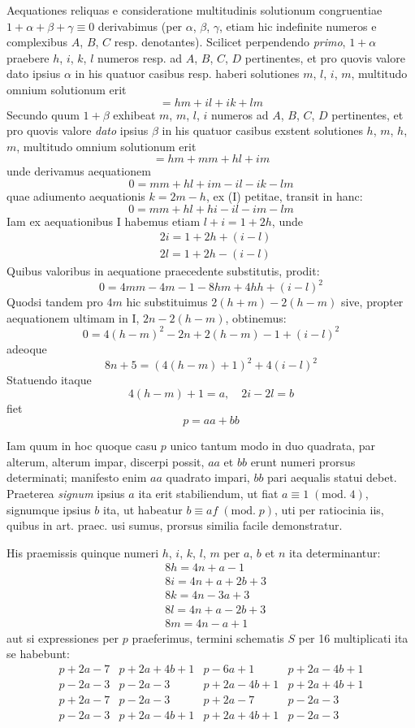 \documentclass[twoside,12pt]{memoir}
\renewcommand{\pmod}[1]{\;(\textrm{mod.}\;#1)}
\begin{document}
Aequationes reliquas e consideratione multitudinis solutionum congruentiae \(1+\alpha+\beta+\gamma \equiv 0\) derivabimus (per \(\alpha\), \(\beta\), \(\gamma\), etiam hic indefinite numeros e complexibus \(A\), \(B\), \(C\) resp. denotantes). Scilicet perpendendo \textit{primo}, \(1+\alpha\) praebere \(h\), \(i\), \(k\), \(l\) numeros resp. ad \(A\), \(B\), \(C\), \(D\) pertinentes, et pro quovis valore dato ipsius \(\alpha\) in his quatuor casibus resp. haberi solutiones \(m\), \(l\), \(i\), \(m\), multitudo omnium solutionum erit
\[=h m+i l+i k+l m\]
Secundo quum \(1+\beta\) exhibeat \(m\), \(m\), \(l\), \(i\) numeros ad \(A\), \(B\), \(C\), \(D\) pertinentes, et pro quovis valore \textit{dato} ipsius \(\beta\) in his quatuor casibus exstent solutiones \(h\), \(m\), \(h\), \(m\), multitudo omnium solutionum erit
\[=h m+m m+h l+i m\]
unde derivamus aequationem
\[0=m m+h l+i m-i l-i k-l m\]
quae adiumento aequationis \(k=2 m-h\), ex (I) petitae, transit in hanc:
\[0=m m+h l+h i-i l-i m-l m\]
Iam ex aequationibus I habemus etiam \(l+i=1+2 h\), unde
\[\begin{aligned}
& 2 i=1+2 h+(i-l) \\
& 2 l=1+2 h-(i-l)
\end{aligned}\]\pagebreak%
Quibus valoribus in aequatione praecedente substitutis, prodit:
\[0=4 m m-4 m-1-8 h m+4 h h+(i-l)^{2}\]
Quodsi tandem pro \(4 m\) hic substituimus \(2(h+m)-2(h-m)\) sive, propter aequationem ultimam in I, \(2 n-2(h-m)\), obtinemus:
\[0=4(h-m)^{2}-2 n+2(h-m)-1+(i-l)^{2}\]
adeoque
\[8 n+5=(4(h-m)+1)^{2}+4(i-l)^{2}\]
Statuendo itaque
\[4(h-m)+1=a, \quad 2 i-2 l=b\]
fiet
\[p=a a+b b\]

Iam quum in hoc quoque casu \(p\) unico tantum modo in duo quadrata, par alterum, alterum impar, discerpi possit, \(a a\) et \(b b\) erunt numeri prorsus determinati; manifesto enim \(a a\) quadrato impari, \(b b\) pari aequalis statui debet. Praeterea \textit{signum} ipsius \(a\) ita erit stabiliendum, ut fiat \(a \equiv 1\pmod{4}\), signumque ipsius \(b\) ita, ut habeatur \(b \equiv a f\pmod{p}\), uti per ratiocinia iis, quibus in art. praec. usi sumus, prorsus similia facile demonstratur.

His praemissis quinque numeri \(h\), \(i\), \(k\), \(l\), \(m\) per \(a\), \(b\) et \(n\) ita determinantur:
\[\begin{aligned}
& 8 h=4 n+a-1 \\
& 8 i=4 n+a+2 b+3 \\
& 8 k=4 n-3 a+3 \\
& 8 l=4 n+a-2 b+3 \\
& 8 m=4 n-a+1
\end{aligned}\]
aut si expressiones per \(p\) praeferimus, termini schematis \(S\) per 16 multiplicati ita se habebunt:
\[\begin{array}{l|l|l|l}
p+2 a-7 & p+2 a+4 b+1 & p-6 a+1 & p+2 a-4 b+1 \\
p-2 a-3 & p-2 a-3 & p+2 a-4 b+1 & p+2 a+4 b+1 \\
p+2 a-7 & p-2 a-3 & p+2 a-7 & p-2 a-3 \\
p-2 a-3 & p+2 a-4 b+1 & p+2 a+4 b+1 & p-2 a-3
\end{array}\]\pagebreak%
\end{document}
